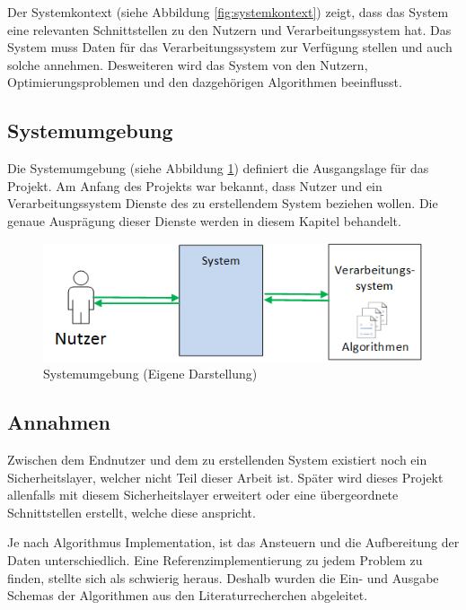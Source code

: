 Der Systemkontext (siehe Abbildung \ref{fig:systemkontext}) zeigt, dass das System eine relevanten Schnittstellen zu den Nutzern und Verarbeitungssystem hat. Das System muss Daten für 
das Verarbeitungssystem zur Verfügung stellen und auch solche annehmen. Desweiteren wird das System von den Nutzern, Optimierungsproblemen und den dazgehörigen Algorithmen 
beeinflusst.

\FloatBarrier
\subsection{Systemumgebung}\label{systemumgebung}
Die Systemumgebung (siehe Abbildung \ref{fig:systemumgebung}) definiert die Ausgangslage für das Projekt. Am Anfang des Projekts war bekannt, dass Nutzer und ein Verarbeitungssystem 
Dienste des zu erstellendem System beziehen wollen. Die genaue Ausprägung dieser Dienste werden in diesem Kapitel behandelt.

\begin{figure}[h]
\centering
\includegraphics[scale=0.8]{images/visio/systemumgebung.png}
\caption[Systemumgebung]{Systemumgebung (Eigene Darstellung)}
\label{fig:systemumgebung}
\end{figure}

\FloatBarrier
\subsection{Annahmen}\label{annahmen}
Zwischen dem Endnutzer und dem zu erstellenden System existiert noch ein Sicherheitslayer, welcher nicht Teil dieser Arbeit ist. Später wird dieses Projekt allenfalls mit diesem Sicherheitslayer 
erweitert oder eine übergeordnete Schnittstellen erstellt, welche diese anspricht. 

Je nach Algorithmus Implementation, ist das Ansteuern und die Aufbereitung der Daten unterschiedlich. Eine Referenzimplementierung zu jedem Problem zu finden, stellte sich als schwierig 
heraus. Deshalb wurden die Ein- und Ausgabe Schemas der Algorithmen aus den Literaturrecherchen abgeleitet.

